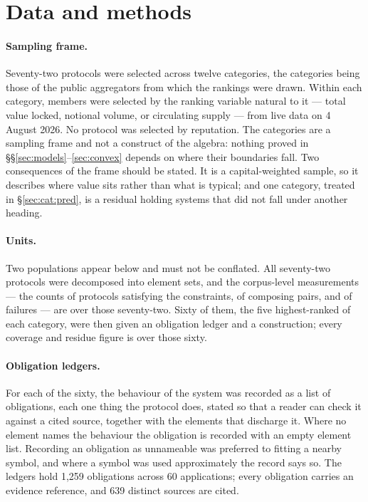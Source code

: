 \documentclass[11pt,reqno]{amsart}
\theoremstyle{plain}
\theoremstyle{definition}
\theoremstyle{remark}
\begin{document}
\section{Data and methods}\label{sec:methods}

\paragraph{Sampling frame.} Seventy-two protocols were selected across twelve
categories, the categories being those of the public aggregators from which the
rankings were drawn. Within each category, members were selected by the ranking
variable natural to it --- total value locked, notional volume, or circulating
supply --- from live data on 4 August 2026. No protocol was selected by
reputation. The categories are a sampling frame and not a construct of the
algebra: nothing proved in \S\S\ref{sec:models}--\ref{sec:convex} depends on
where their boundaries fall. Two consequences of the frame should be stated. It
is a capital-weighted sample, so it describes where value sits rather than what
is typical; and one category, treated in \S\ref{sec:cat:pred}, is a residual
holding systems that did not fall under another heading.

\paragraph{Units.} Two populations appear below and must not be conflated. All
seventy-two protocols were decomposed into element sets, and the corpus-level
measurements --- the counts of protocols satisfying the constraints, of
composing pairs, and of failures --- are over those seventy-two. Sixty of them,
the five highest-ranked of each category, were then given an obligation ledger
and a construction; every coverage and residue figure is over those sixty.

\paragraph{Obligation ledgers.} For each of the sixty, the behaviour of the
system was recorded as a list of obligations, each one thing the protocol does,
stated so that a reader can check it against a cited source, together with the
elements that discharge it. Where no element names the behaviour the obligation
is recorded with an empty element list. Recording an obligation as unnameable
was preferred to fitting a nearby symbol, and where a symbol was used
approximately the record says so. The ledgers hold 1{,}259 obligations across
60 applications; every obligation carries an evidence reference, and
639 distinct sources are cited.
\end{document}
